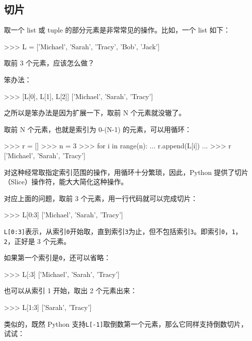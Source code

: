 \hypertarget{ux5207ux7247}{%
\subsection{切片}\label{ux5207ux7247}}

取一个 list 或 tuple 的部分元素是非常常见的操作。比如，一个 list 如下：

\begin{pythoncode}
>>> L = ['Michael', 'Sarah', 'Tracy', 'Bob', 'Jack']
\end{pythoncode}

取前 3 个元素，应该怎么做？

笨办法：

\begin{pythoncode}
>>> [L[0], L[1], L[2]]
['Michael', 'Sarah', 'Tracy']
\end{pythoncode}

之所以是笨办法是因为扩展一下，取前 N 个元素就没辙了。

取前 N 个元素，也就是索引为 0-(N-1) 的元素，可以用循环：

\begin{pythoncode}
>>> r = []
>>> n = 3
>>> for i in range(n):
...     r.append(L[i])
... 
>>> r
['Michael', 'Sarah', 'Tracy']
\end{pythoncode}

对这种经常取指定索引范围的操作，用循环十分繁琐，因此，Python
提供了切片（Slice）操作符，能大大简化这种操作。

对应上面的问题，取前 3 个元素，用一行代码就可以完成切片：

\begin{pythoncode}
>>> L[0:3]
['Michael', 'Sarah', 'Tracy']
\end{pythoncode}

\texttt{L{[}0:3{]}}表示，从索引\texttt{0}开始取，直到索引\texttt{3}为止，但不包括索引\texttt{3}。即索引\texttt{0}，\texttt{1}，\texttt{2}，正好是
3 个元素。

如果第一个索引是\texttt{0}，还可以省略：

\begin{pythoncode}
>>> L[:3]
['Michael', 'Sarah', 'Tracy']
\end{pythoncode}

也可以从索引 1 开始，取出 2 个元素出来：

\begin{pythoncode}
>>> L[1:3]
['Sarah', 'Tracy']
\end{pythoncode}

类似的，既然 Python
支持\texttt{L{[}-1{]}}取倒数第一个元素，那么它同样支持倒数切片，试试：

